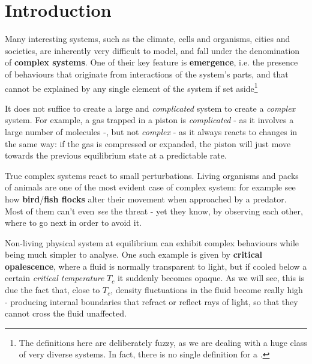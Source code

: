 \documentclass[../template.tex]{subfiles}
\begin{document}
\section{Introduction}
Many interesting systems, such as the climate, cells and organisms, cities and societies, are inherently very difficult to model, and fall under the denomination of \textbf{complex systems}. 
One of their key feature is \textbf{emergence}, i.e. the presence of  behaviours that originate from interactions of the system's parts, and that cannot be explained by any single element of the system if set aside\footnote{The definitions here are deliberately fuzzy, as we are dealing with a huge class of very diverse systems. In fact, there is no single  definition for a .}

\medskip

It does not suffice to create a large and \textit{complicated} system to create a \textit{complex} system. For example, a gas trapped in a piston is \textit{complicated} - as it involves a large number of molecules -, but not \textit{complex} - as it always reacts to changes in the same way: if the gas is compressed or expanded, the piston will just move towards the previous equilibrium state at a predictable rate.

\medskip

True complex systems react  to small perturbations. Living organisms and packs of animals are one of the most evident case of complex system: for example see how \textbf{bird}/\textbf{fish flocks} alter their movement when approached by a predator. Most of them can't even \textit{see} the threat - yet they know, by observing each other, where to go next in order to avoid it.

\medskip

Non-living physical system at equilibrium can exhibit complex behaviours while being much simpler to analyse. One such example is given by \textbf{critical opalescence}, where a fluid is normally transparent to light, but if cooled below a certain \textit{critical temperature} $T_c$ it suddenly becomes opaque. As we will see, this is due the fact that, close to $T_c$, density fluctuations in the fluid become really high - producing internal boundaries that refract or reflect rays of light, so that they cannot cross the fluid unaffected.
\end{document}
